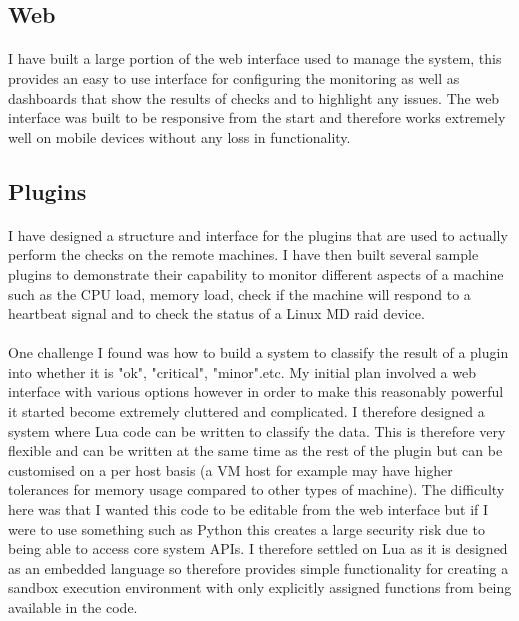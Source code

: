 \documentclass[bsc,logo,twoside]{infthesis}
\begin{document}
\subsection{Web}
\paragraph*{}
	I have built a large portion of the web interface used to manage the system,
	this provides an easy to use interface for configuring the monitoring as well
	as dashboards that show the results of checks and to highlight any issues.
	The web interface was built to be responsive from the start and therefore
	works extremely well on mobile devices without any loss in functionality.
	
\subsection*{Plugins}
\paragraph*{}
	I have designed a structure and interface for the plugins that are used to
	actually perform the checks on the remote machines. I have then built several
	sample plugins to demonstrate their capability to monitor different aspects of
	a machine such as the CPU load, memory load, check if the machine will respond
	to a heartbeat signal and to check the status of a Linux MD raid device.
	
\paragraph*{}
	One challenge I found was how to build a system to classify the result of a
	plugin into whether it is "ok", "critical", "minor".etc.  My initial plan
	involved a web interface with various options however in order to make this
	reasonably powerful it started become extremely cluttered and complicated. I
	therefore designed a system where Lua code can be written to classify the
	data.  This is therefore very flexible and can be written at the same time
	as the rest of the plugin but can be customised on a per host basis (a VM
	host for example may have higher tolerances for memory usage compared to
	other types of machine).  The difficulty here was that I wanted this code to
	be editable from the web interface but if I were to use something such as
	Python this creates a large security risk due to being able to access core
	system APIs. I therefore settled on Lua as it is designed as an embedded
	language so therefore provides simple functionality for creating a sandbox
	execution environment with only explicitly assigned functions from being
	available in the code.
	
\end{document}
